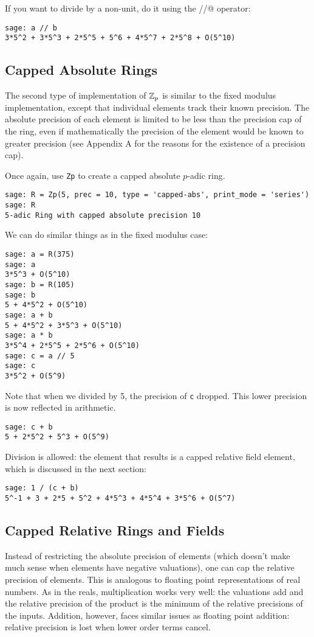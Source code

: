 \documentclass[12pt]{article}
\begin{document}
If you want to divide by a non-unit, do it using the \verb@//@ operator:
\begin{verbatim}
sage: a // b
3*5^2 + 3*5^3 + 2*5^5 + 5^6 + 4*5^7 + 2*5^8 + O(5^10)
\end{verbatim}

\subsection{Capped Absolute Rings}
The second type of implementation of $\mathbb{Z}_p$ is similar to the fixed modulus implementation,
except that individual elements track their known precision. 
The absolute precision of each element is limited to be less than the precision cap of the ring,
even if mathematically the precision of the element would be known to greater precision
(see Appendix A for the reasons for the existence of a precision cap).

Once again, use \verb/Zp/ to create a capped absolute $p$-adic ring.
\begin{verbatim}
sage: R = Zp(5, prec = 10, type = 'capped-abs', print_mode = 'series')
sage: R
5-adic Ring with capped absolute precision 10
\end{verbatim}

We can do similar things as in the fixed modulus case:
\begin{verbatim}
sage: a = R(375)
sage: a
3*5^3 + O(5^10)
sage: b = R(105)
sage: b
5 + 4*5^2 + O(5^10)
sage: a + b
5 + 4*5^2 + 3*5^3 + O(5^10)
sage: a * b
3*5^4 + 2*5^5 + 2*5^6 + O(5^10)
sage: c = a // 5
sage: c
3*5^2 + O(5^9)
\end{verbatim}

Note that when we divided by 5, the precision of \verb/c/ dropped.  This lower precision is now reflected in arithmetic.
\begin{verbatim}
sage: c + b
5 + 2*5^2 + 5^3 + O(5^9)
\end{verbatim}

Division is allowed: the element that results is a capped relative field element, which is discussed in the next section:
\begin{verbatim}
sage: 1 / (c + b)
5^-1 + 3 + 2*5 + 5^2 + 4*5^3 + 4*5^4 + 3*5^6 + O(5^7)
\end{verbatim}

\subsection{Capped Relative Rings and Fields}
Instead of restricting the absolute precision of elements (which doesn't make much sense when elements have negative
valuations), one can cap the relative precision of elements.  This is analogous to floating point representations
of real numbers.  As in the reals, multiplication works very well: the valuations add and the relative precision of
the product is the minimum of the relative precisions of the inputs.   Addition, however, faces similar issues as
floating point addition: relative precision is lost when lower order terms cancel.
\end{document}
